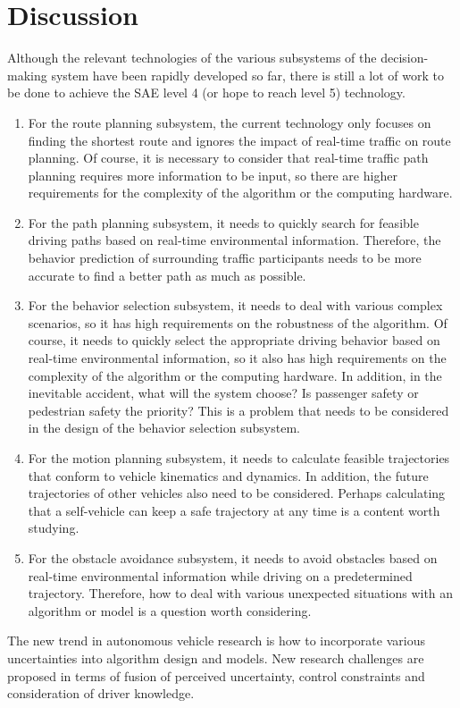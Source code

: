 \documentclass[conference]{IEEEtran}
\begin{document}
\section{Discussion}
Although the relevant technologies of the various subsystems of the decision-making system have been rapidly developed so far, there is still a lot of work to be done to achieve the SAE level 4 (or hope to reach level 5) technology.

\begin{enumerate}
	\item For the route planning subsystem, the current technology only focuses on finding the shortest route and ignores the impact of real-time traffic on route planning.  Of course, it is necessary to consider that real-time traffic path planning requires more information to be input, so there are higher requirements for the complexity of the algorithm or the computing hardware.
	
	\item For the path planning subsystem, it needs to quickly search for feasible driving paths based on real-time environmental information. Therefore, the behavior prediction of surrounding traffic participants needs to be more accurate to find a better path as much as possible.
	
	\item For the behavior selection subsystem, it needs to deal with various complex scenarios, so it has high requirements on the robustness of the algorithm.  Of course, it needs to quickly select the appropriate driving behavior based on real-time environmental information, so it also has high requirements on the complexity of the algorithm or the computing hardware.  In addition, in the inevitable accident, what will the system choose?  Is passenger safety or pedestrian safety the priority?  This is a problem that needs to be considered in the design of the behavior selection subsystem.
	
	
	\item For the motion planning subsystem, it needs to calculate feasible trajectories that conform to vehicle kinematics and dynamics.  In addition, the future trajectories of other vehicles also need to be considered.  Perhaps calculating that a self-vehicle can keep a safe trajectory at any time is a content worth studying.
	
	\item For the obstacle avoidance subsystem, it needs to avoid obstacles based on real-time environmental information while driving on a predetermined trajectory.  Therefore, how to deal with various unexpected situations with an algorithm or model is a question worth considering.
\end{enumerate}
The new trend in autonomous vehicle research is how to incorporate various uncertainties into algorithm design and models.  New research challenges are proposed in terms of fusion of perceived uncertainty, control constraints and consideration of driver knowledge.
\end{document}
